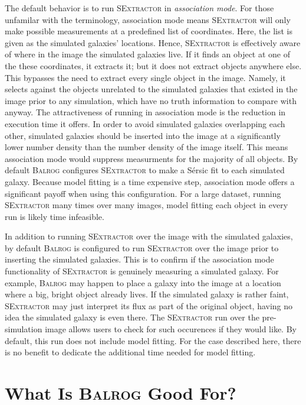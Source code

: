 \documentclass[12pt]{book}
\newcommand{\balrog}{\textsc{Balrog}}
\newcommand{\sex}{\textsc{SExtractor}}
\newcommand{\sersic}{S\'{e}rsic}
\begin{document}
The default behavior is to run \sex{} in \emph{association mode}.
For those unfamilar with the terminology, association mode means
\sex{} will only make possible measurements at a predefined list of coordinates.
Here, the list is given as the simulated galaxies' locations. 
Hence, \sex{} is effectively aware of where in the image the simulated galaxies live.
If it finds an object at one of the these coordinates, it extracts it;
but it does not extract objects anywhere else.
This bypasses the need to extract every single object in the image. 
Namely, it  selects against the objects unrelated to the simulated galaxies that 
existed in the image prior to any simulation,
which have no truth information to compare with anyway.
The attractiveness of running in association mode is the reduction in execution time it offers.
In order to avoid simulated galaxies overlapping each other, simulated galaxies should be inserted
into the image at a significantly lower number density than the number density of the image itself.
This means association mode would suppress measurments for the majority of all objects.
By default \balrog{} configures \sex{} to make a \sersic{} fit to each simulated galaxy.
Because model fitting is a time expensive step,
association mode offers a significant payoff when using this configuration.
For a large dataset, running \sex{} many times over many images, model fitting 
each object in every run is likely time infeasible.

In addition to running \sex{} over the image with the simulated galaxies,
by default \balrog{} is configured to run \sex{} over the image prior to inserting the simulated galaxies.
This is to confirm if the association mode functionality of \sex{} is genuinely measuring a simulated galaxy.
For example, \balrog{} may happen to place a galaxy into the image at a location where a big, bright object already lives.
If the simulated galaxy is rather faint, \sex{} may just interpret its flux as part of the original object, having no
idea the simulated galaxy is even there. The \sex{} run over the pre-simulation image allows users to check
for such occurences if they would like. By default, this run does not include model fitting.
For the case described here, there is no benefit to dedicate the additional time needed for model fitting.


\chapter{What Is \balrog{} Good For?}
\label{sec:motivation}
\end{document}
